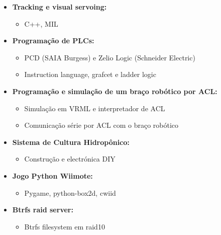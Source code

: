 \documentclass[a4paper,portuguese]{article}
\begin{document}
\begin{itemize}
    \item[] {\bf Tracking e visual servoing:}\\ \vspace{-7mm}
    \begin{itemize}
        \setlength{\itemsep}{-1mm}
        \item C++, MIL
    \end{itemize}

    \item[] {\bf Programação de PLCs:}\\ \vspace{-7mm}
    \begin{itemize}
        \setlength{\itemsep}{-1mm}
        \item PCD (SAIA Burgess) e Zelio Logic (Schneider Electric)
        \item Instruction language, grafcet e ladder logic
    \end{itemize}

    \item[] {\bf  Programação e simulação de um braço robótico por ACL:}\\ \vspace{-7mm}
    \begin{itemize}
    \setlength{\itemsep}{-1mm}
        \item Simulação em VRML e interpretador de  ACL
        \item Comunicação série por ACL com o braço robótico
    \end{itemize}

    \item[] {\bf Sistema de Cultura Hidropônico:}\\ \vspace{-7mm}
    \begin{itemize}
    \setlength{\itemsep}{-1mm}
        \item Construção e electrónica DIY
    \end{itemize}

    \item[] {\bf Jogo Python Wiimote:}\\ \vspace{-7mm}
    \begin{itemize}
    \setlength{\itemsep}{-1mm}
        \item Pygame, python-box2d, cwiid
    \end{itemize}

    \item[] {\bf Btrfs raid server:}\\ \vspace{-7mm}
    \begin{itemize}
    \setlength{\itemsep}{-1mm}
        \item Btrfs filesystem em raid10
    \end{itemize}
\end{itemize}
\end{document}
